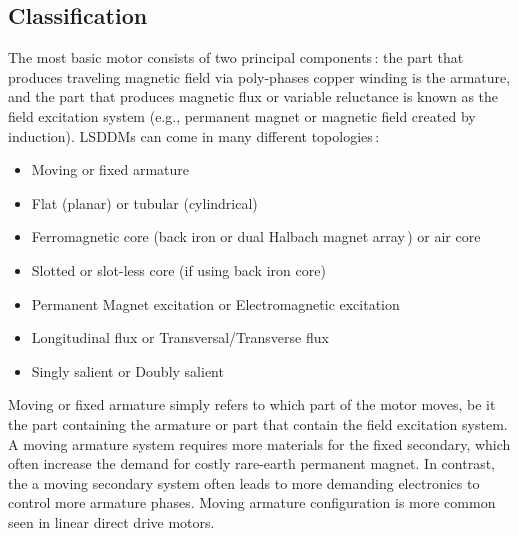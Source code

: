    
    \subsection{Classification}                     \label{Chapter:background/linear synchronous motors for NFJI/classification}
    
        
        The most basic motor consists of two principal components\,\cite{JacekF.GierasZbigniewJ.Piech2017LinearSystems}: the part that produces traveling magnetic field via poly-phases copper winding is the armature, and the part that produces magnetic flux or variable reluctance is known as the field excitation system (e.g., permanent magnet or magnetic field created by induction). \acsp{LSDDM} can come in many different topologies\,\cite{Laithwaite1970}:
        
        
        \begin{itemize}
            \item Moving or fixed armature
            \item Flat (planar) or tubular (cylindrical)
            \item Ferromagnetic core (back iron or dual Halbach magnet array\,\cite{Halbach1980}) or air core
            \item Slotted or slot-less core (if using back iron core)
            \item Permanent Magnet excitation or Electromagnetic excitation
            \item Longitudinal flux or Transversal/Transverse flux
            \item Singly salient or Doubly salient
        \end{itemize}
        
        
        Moving or fixed armature simply refers to which part of the motor moves, be it the part containing the armature or part that contain the field excitation system. A moving armature system requires more materials for the fixed secondary, which often increase the demand for costly rare-earth permanent magnet. In contrast, the a moving secondary system often leads to more demanding electronics to control more armature phases. Moving armature configuration is more common seen in linear direct drive motors. 
        
